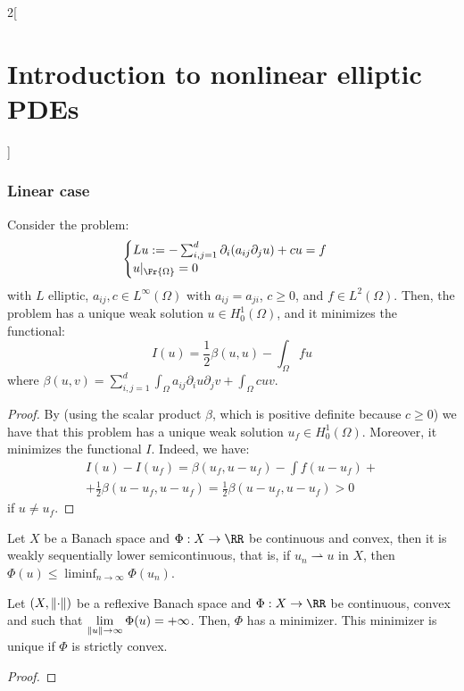 \documentclass[../../../main_math.tex]{subfiles}
\begin{document}
\begin{multicols}{2}[\section{Introduction to nonlinear elliptic PDEs}]
  \subsubsection{Linear case}
  \begin{proposition}
    Consider the problem:
    \begin{equation}\label{INEPDE:var_linear_problem}
      \begin{cases}
        Lu:=-\sum_{i,j=1}^d \partial_i(a_{ij}\partial_j u)+cu=f \\
        u|_{\Fr{\Omega}}=0
      \end{cases}
    \end{equation}
    with $L$ elliptic, $a_{ij},c\in L^\infty(\Omega)$ with $a_{ij}= a_{ji}$, $c\geq 0$, and $f\in L^2(\Omega)$. Then, the problem has a unique weak solution $u\in H_0^1(\Omega)$, and it minimizes the functional:
    $$
      I(u)=\frac{1}{2}\beta(u,u)-\int_\Omega fu
    $$
    where $\displaystyle\beta(u,v)=\sum_{i,j=1}^d\int_\Omega a_{ij}\partial_i u\partial_j v + \int_\Omega cuv$.
  \end{proposition}
  \begin{proof}
    By  (using the scalar product $\beta$, which is positive definite because $c\geq 0$) we have that this problem has a unique weak solution $u_f\in H_0^1(\Omega)$. Moreover, it minimizes the functional $I$. Indeed, we have:
    \begin{multline*}
      I(u)-I(u_f)=\beta(u_f,u-u_f)-\int f(u-u_f)+\\
      +\frac{1}{2}\beta(u-u_f,u-u_f)= \frac{1}{2} \beta(u-u_f,u-u_f)>0
    \end{multline*}
    if $u\ne u_f$.
  \end{proof}
  \begin{lemma}\label{INEPDE:optimization}
    Let $X$ be a Banach space and $\Phi:X\to \RR$ be continuous and convex, then it is weakly sequentially lower semicontinuous, that is, if $u_n\rightharpoonup u$ in $X$, then $\displaystyle\Phi(u)\leq \liminf_{n\to\infty}\Phi(u_n)$.
  \end{lemma}
  \begin{theorem}
    Let $(X,\norm{\cdot})$ be a reflexive Banach space and $\Phi:X\to \RR$ be continuous, convex and such that $\displaystyle \lim_{\norm{u}\to\infty}\Phi(u)=+\infty$. Then, $\Phi$ has a minimizer. This minimizer is unique if $\Phi$ is strictly convex.
  \end{theorem}
  \begin{proof}

\end{proof}
\end{multicols}
\end{document}

